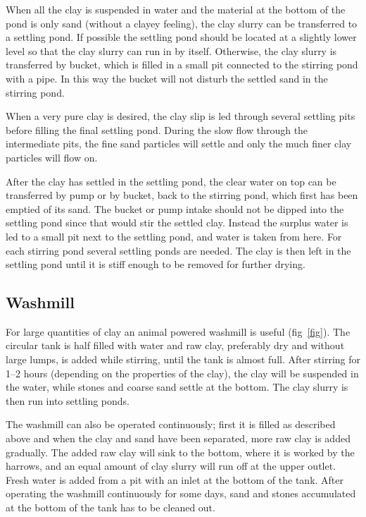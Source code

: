 When all the clay is suspended in water and the material at the bottom of the 
pond is only sand (without a clayey feeling), the clay slurry can be 
transferred to a settling pond. If possible the settling pond should be located 
at a slightly lower level so that the clay slurry can run in by itself. 
Otherwise, the clay slurry is transferred by bucket, which is filled in a small 
pit connected to the stirring pond with a pipe. In this way the bucket will not 
disturb the settled sand in the stirring pond.

When a very pure clay is desired, the clay slip is led through several settling 
pits before filling the final settling pond. During the slow flow through the 
intermediate pits, the fine sand particles will settle and only the much finer 
clay particles will flow on.

After the clay has settled in the settling pond, the clear water on top can be 
transferred by pump or by bucket, back to the stirring pond, which first has 
been emptied of its sand. The bucket or pump intake should not be dipped into 
the settling pond since that would stir the settled clay. Instead the surplus 
water is led to a small pit next to the settling pond, and water is taken from 
here. For each stirring pond several settling ponds are needed. The clay is 
then left in the settling pond until it is stiff enough to be removed for 
further drying.
\subsection{Washmill}
For large quantities of clay an animal powered washmill is useful 
(fig~\ref{fig}). The circular tank is half filled with water and raw clay, 
preferably dry and without large lumps, is added while stirring, until the tank 
is almost full. After stirring for 1--2 hours (depending on the properties of 
the clay), the clay will be suspended in the water, while stones and coarse 
sand settle at the bottom. The clay slurry is then run into settling ponds.

The washmill can also be operated continuously; first it is filled as described 
above and when the clay and sand have been separated, more raw clay is added 
gradually. The added raw clay will sink to the bottom, where it is worked by 
the harrows, and an equal amount of clay slurry will run off at the upper 
outlet. Fresh water is added from a pit with an inlet at the bottom of the 
tank. After operating the washmill continuously for some days, sand and stones 
accumulated at the bottom of the tank has to be cleaned out.
